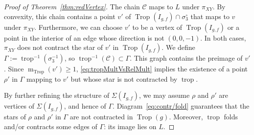 \documentclass[11pt]{amsart}
\numberwithin{equation}{section}
\theoremstyle{plain}
\theoremstyle{definition}
\theoremstyle{remark}
\begin{document}
\begin{proof}[Proof of Theorem~\ref{thm:redVertex}]
  The chain $\mathscr{C}$ maps to $L$ under $\pi_{XY}$. By convexity,
  this chain contains a point $v'$ of $\operatorname{Trop}(I_{g,f})\cap
  \sigma_3^{\circ}$ that maps to $v$ under $\pi_{XY}$. Furthermore, we
  can choose $v'$ to be a vertex of $\operatorname{Trop}(I_{g,f})$ or a point in the
  interior of an edge whose direction is not $(0,0,-1)$. In both
  cases, $\pi_{XY}$ does not contract the star of $v'$ in
  $\operatorname{Trop}(I_{g,f})$. We define $\Gamma := \operatorname{trop}^{-1}(\sigma_3^{-1})$,
  so $\operatorname{trop}^{-1}(\mathscr{C})\subset \Gamma$.  This graph contains the
  preimage of $v'$. Since $\operatorname{\operatorname{m}}_\operatorname{Trop}(v')\geq 1$,
  \eqref{eq:tropMultVsRelMult} implies the existence of a point
  $\rho'$ in $\Gamma$ mapping to $v'$ but whose star is not contracted
  by $\operatorname{trop}$.

  By further refining the structure of $\Sigma(I_{g,f})$, we may
  assume $\rho$ and $\rho'$ are vertices of $\Sigma(I_{g,f})$, and
  hence of $\Gamma$. Diagram~\eqref{eq:contr/fold} guarantees that the
  stars of $\rho$ and $\rho'$ in $\Gamma$ are not contracted in
  $\operatorname{Trop}(g)$. Moreover, $\operatorname{trop}$ folds and/or contracts some edges of
  $\Gamma$: its image lies on $L$.
\end{proof}
\end{document}
